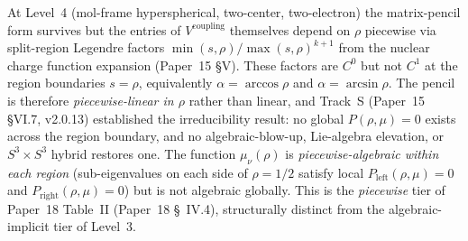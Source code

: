 At Level~4 (mol-frame hyperspherical, two-center, two-electron) the
matrix-pencil form survives but the entries of $V^\text{coupling}$
themselves depend on $\rho$ piecewise via split-region Legendre
factors $\min(s, \rho) / \max(s, \rho)^{k+1}$ from the nuclear charge
function expansion (Paper~15 §V).  These factors are $C^0$ but not
$C^1$ at the region boundaries $s = \rho$, equivalently $\alpha =
\arccos\rho$ and $\alpha = \arcsin\rho$.  The pencil is therefore
\emph{piecewise-linear in $\rho$} rather than linear, and Track~S
(Paper~15 §VI.7, v2.0.13) established the irreducibility result: no
global $P(\rho, \mu) = 0$ exists across the region boundary, and no
algebraic-blow-up, Lie-algebra elevation, or $S^3 \times S^3$ hybrid
restores one.  The function $\mu_\nu(\rho)$ is \emph{piecewise-algebraic
within each region} (sub-eigenvalues on each side of $\rho = 1/2$
satisfy local $P_\text{left}(\rho, \mu) = 0$ and $P_\text{right}(\rho,
\mu) = 0$) but is not algebraic globally.  This is the
\emph{piecewise} tier of Paper~18 Table~II (Paper~18 \S~IV.4),
structurally distinct from the algebraic-implicit tier of Level~3.
\smallskip

